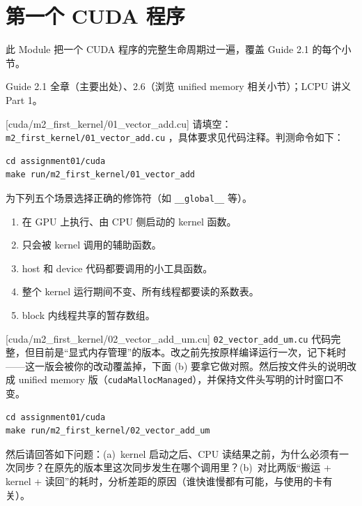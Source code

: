 \documentclass[11pt,a4paper,fontset=none]{ctexart}
\begin{document}
\section{第一个 CUDA 程序}

此 Module 把一个 CUDA 程序的完整生命周期过一遍，覆盖 Guide 2.1 的每个小节。

\begin{reading}
Guide 2.1 全章（主要出处）、2.6（浏览 unified memory 相关小节）；LCPU 讲义 Part 1。
\end{reading}

[cuda/m2\_first\_kernel/01\_vector\_add.cu]
请填空：\texttt{m2\_first\_kernel/01\_vector\_add.cu} ，具体要求见代码注释。判测命令如下：

\begin{lstlisting}
cd assignment01/cuda
make run/m2_first_kernel/01_vector_add
\end{lstlisting}

为下列五个场景选择正确的修饰符（如 \texttt{\_\_global\_\_} 等）。
\begin{enumerate}[label=(\alph*)]
  \item 在 GPU 上执行、由 CPU 侧启动的 kernel 函数。
  \item 只会被 kernel 调用的辅助函数。
  \item host 和 device 代码都要调用的小工具函数。
  \item 整个 kernel 运行期间不变、所有线程都要读的系数表。
  \item block 内线程共享的暂存数组。
\end{enumerate}

[cuda/m2\_first\_kernel/02\_vector\_add\_um.cu]
\texttt{02\_vector\_add\_um.cu} 代码完整，但目前是“显式内存管理”的版本。改之前先按原样编译运行一次，记下耗时——这一版会被你的改动覆盖掉，下面 (b) 要拿它做对照。然后按文件头的说明改成 unified memory 版（\texttt{cudaMallocManaged}），并保持文件头写明的计时窗口不变。

\begin{lstlisting}
cd assignment01/cuda
make run/m2_first_kernel/02_vector_add_um
\end{lstlisting}

然后请回答如下问题：(a)~kernel 启动之后、CPU 读结果之前，为什么必须有一次同步？在原先的版本里这次同步发生在哪个调用里？(b)~对比两版“搬运 + kernel + 读回”的耗时，分析差距的原因（谁快谁慢都有可能，与使用的卡有关）。
\end{document}
